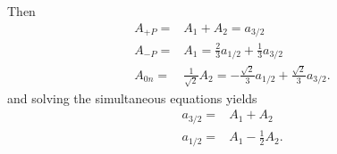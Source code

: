 \documentclass[main.tex]{subfiles}
\begin{document}
Then
\begin{align}
A_{+P}=&A_1+A_2=a_{3/2}\\
A_{-P}=&A_1=\frac{2}{3}a_{1/2}+\frac{1}{3}a_{3/2}\\
A_{0n}=&\frac{1}{\sqrt{2}}A_2=-\frac{\sqrt{2}}{3}a_{1/2}+\frac{\sqrt{2}}{3}a_{3/2}.
\end{align}
and solving the simultaneous equations yields
\begin{align}
a_{3/2}=&A_1+A_2\\
a_{1/2}=&A_1-\frac{1}{2}A_2.
\end{align}
\end{document}
